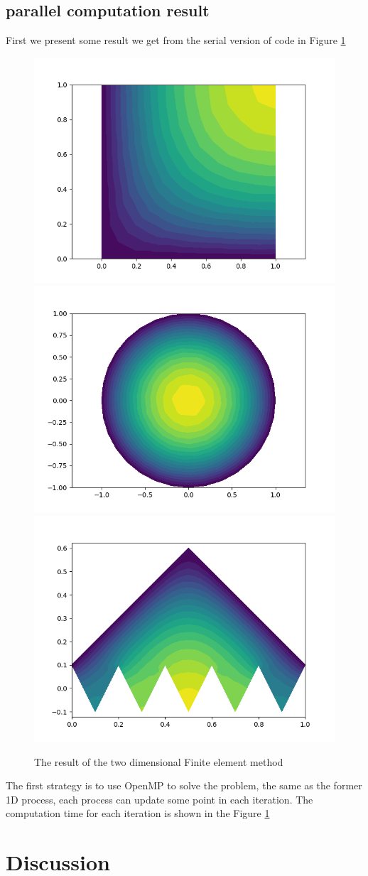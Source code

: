 \documentclass[11pt]{article}
\begin{document}
\subsection{parallel computation result}
First we present some result we get from the serial version of code in Figure \ref{fig:2D_result}
\begin{figure}
    \centering
    \includegraphics[width=0.3\linewidth]{../CPP_code/2D_problem/cpp_code/serial_version/square/result.png}
    \includegraphics[width=0.3\linewidth]{../CPP_code/2D_problem/cpp_code/serial_version/sphere/result.png}
    \includegraphics[width=0.3\linewidth]{../CPP_code/2D_problem/cpp_code/serial_version/test3/result.png}
    \caption{The result of the two dimensional Finite element method}
    \label{fig:2D_result}
\end{figure}

The first strategy  is to use OpenMP to solve the problem, the same as the former 1D process, each process can update some point in each iteration. The computation time for each iteration is shown in the Figure \ref{}
\section{Discussion}
\end{document}
